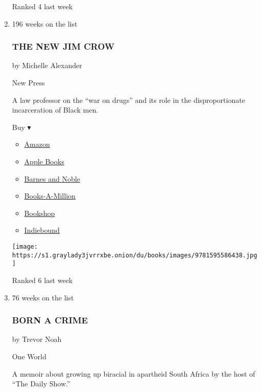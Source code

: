 \begin{enumerate}
  Ranked 4 last week
\item
  196 weeks on the list

  \hypertarget{the-new-jim-crow}{%
  \subsubsection{THE NEW JIM CROW}\label{the-new-jim-crow}}

  by Michelle Alexander

  New Press

  A law professor on the ``war on drugs'' and its role in the
  disproportionate incarceration of Black men.

  Buy ▾

  \begin{itemize}
  \tightlist
  \item
    \href{http://www.amazon.com/The-New-Crow-Incarceration-Colorblindness/dp/1595586431?tag=NYTBS-20}{Amazon}
  \item
    \href{https://du-gae-books-dot-nyt-du-prd.appspot.com/buy?title=THE+NEW+JIM+CROW\&author=Michelle+Alexander}{Apple
    Books}
  \item
    \href{https://www.anrdoezrs.net/click-7990613-11819508?url=https\%3A\%2F\%2Fwww.barnesandnoble.com\%2Fw\%2F\%3Fean\%3D9781620971932}{Barnes
    and Noble}
  \item
    \href{https://www.anrdoezrs.net/click-7990613-35140?url=https\%3A\%2F\%2Fwww.booksamillion.com\%2Fp\%2FTHE\%2BNEW\%2BJIM\%2BCROW\%2FMichelle\%2BAlexander\%2F9781620971932}{Books-A-Million}
  \item
    \href{https://bookshop.org/a/3546/9781620971932}{Bookshop}
  \item
    \href{https://www.indiebound.org/book/9781620971932?aff=NYT}{Indiebound}
  \end{itemize}

  \texttt{[image: https://s1.graylady3jvrrxbe.onion/du/books/images/9781595586438.jpg]}

  Ranked 6 last week
\item
  76 weeks on the list

  \hypertarget{born-a-crime}{%
  \subsubsection{BORN A CRIME}\label{born-a-crime}}

  by Trevor Noah

  One World

  A memoir about growing up biracial in apartheid South Africa by the
  host of ``The Daily Show.''


\end{enumerate}
